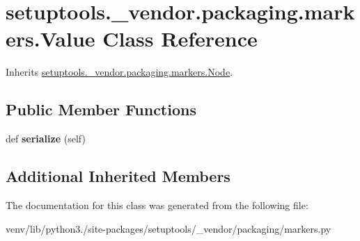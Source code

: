 \hypertarget{classsetuptools_1_1__vendor_1_1packaging_1_1markers_1_1_value}{}\section{setuptools.\+\_\+vendor.\+packaging.\+markers.\+Value Class Reference}
\label{classsetuptools_1_1__vendor_1_1packaging_1_1markers_1_1_value}


Inherits \hyperlink{classsetuptools_1_1__vendor_1_1packaging_1_1markers_1_1_node}{setuptools.\+\_\+vendor.\+packaging.\+markers.\+Node}.

\subsection*{Public Member Functions}
\begin{DoxyCompactItemize}
\item 
\mbox{\label{classsetuptools_1_1__vendor_1_1packaging_1_1markers_1_1_value_a54dd76bf0b8c979909d2bf6f677831c1}} 
def {\bfseries serialize} (self)
\end{DoxyCompactItemize}
\subsection*{Additional Inherited Members}


The documentation for this class was generated from the following file\+:\begin{DoxyCompactItemize}
\item 
venv/lib/python3./site-\/packages/setuptools/\+\_\+vendor/packaging/markers.\+py\end{DoxyCompactItemize}
